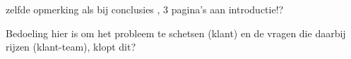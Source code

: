 \begin{tcolorbox}[colback=yellow!30]
  zelfde opmerking als bij conclusies , 3 pagina's aan introductie!? 
  
  Bedoeling hier is om het probleem te schetsen (klant) en de vragen die daarbij rijzen (klant-team), klopt dit?

\end{tcolorbox}
